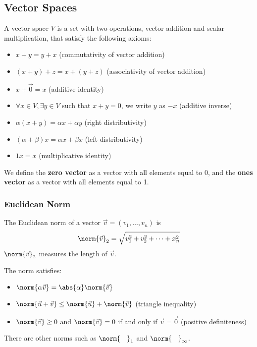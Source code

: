 \documentclass[11pt]{article}
\begin{document}
\subsection{Vector Spaces} 
A vector space $V$ is a set with two operations, vector addition and scalar multiplication, that satisfy the following axioms: 
\begin{itemize}
    \item $x + y = y + x$ (commutativity of vector addition)
    \item $(x + y) + z = x + (y + z)$ (associativity of vector addition)
    \item $x + \vec{0} = x$ (additive identity)
    \item $\forall x \in V, \exists y \in V$ such that $x + y = 0$, we write $y$ as $-x$ (additive inverse)
    \item $\alpha(x + y) = \alpha x + \alpha y$ (right distributivity)
    \item $(\alpha + \beta)x = \alpha x + \beta x$ (left distributivity)
    \item $1x = x$ (multiplicative identity)
\end{itemize}
We define the \textbf{zero vector} as a vector with all elements equal to 0, and the \textbf{ones vector} as a vector with all elements equal to 1. 

\subsubsection*{Euclidean Norm}
The Euclidean norm of a vector $\vec{v} = (v_1, \ldots, v_n)$ is 
\[ \norm{\vec{v}}_2 = \sqrt{v_1^2 + v_2^2 + \cdots + x_n^2} \] 
$\norm{\vec{v}}_2$ measures the length of $\vec{v}$. \par 
The norm satisfies: 
\begin{itemize}
    \item $\norm{\alpha\vec{v}} = \abs{\alpha}\norm{\vec{v}}$
    \item $\norm{\vec{u} + \vec{v}} \leq \norm{\vec{u}} + \norm{\vec{v}}$ (triangle inequality)
    \item $\norm{\vec{v}} \geq 0$ and $\norm{\vec{v}} = 0$ if and only if $\vec{v} = \vec{0}$ (positive definiteness)
\end{itemize}
There are other norms such as $\norm{\phantom{~.~}}_1$ and $\norm{\phantom{~.~}}_\infty$. 
\end{document}
